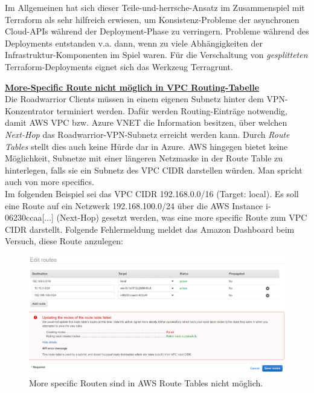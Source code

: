 Im Allgemeinen hat sich dieser \glqq Teile-und-herrsche\grqq{}-Ansatz im Zusammenspiel mit Terraform als sehr hilfreich erwiesen, um Konsistenz-Probleme der asynchronen Cloud-APIs während der Deployment-Phase zu verringern\cite[S.183-184]{Brikman2019}. Probleme während des Deployments entstanden v.a. dann, wenn \glqq zu viele\grqq{} Abhängigkeiten der Infrastruktur-Komponenten im Spiel waren. Für die Verschaltung von \textit{gesplitteten} Terraform-Deployments eignet sich das Werkzeug Terragrunt\cite[S.98]{Brikman2019}.

\newpage
\textbf{\underline{More-Specific Route nicht möglich in VPC Routing-Tabelle}}\\
Die Roadwarrior Clients müssen in einem eigenen Subnetz \glqq hinter\grqq{} dem VPN-Konzentrator terminiert werden. Dafür werden Routing-Einträge notwendig, damit AWS VPC bzw. Azure VNET die Information besitzen, über welchen \textit{Next-Hop} das Roadwarrior-VPN-Subnetz erreicht werden kann. Durch \textit{Route Tables} stellt dies auch keine Hürde dar in Azure. AWS hingegen bietet keine Möglichkeit, Subnetze mit einer längeren Netzmaske in der Route Table zu hinterlegen, falls sie ein Subnetz des VPC CIDR darstellen würden. Man spricht auch von \glqq more specifics\grqq{}.\\
Im folgenden Beispiel sei das VPC CIDR 192.168.0.0/16 (Target: local). Es soll eine Route auf ein Netzwerk 192.168.100.0/24 über die AWS Instance \glqq i-06230ccaa[...]\grqq{} (Next-Hop) gesetzt werden, was eine more specific Route zum VPC CIDR darstellt.
Folgende Fehlermeldung meldet das Amazon Dashboard beim Versuch, diese Route anzulegen:

\begin{figure}[h]
  \centering
  \includegraphics[scale=0.35]{Figures/more_specific_not_allowed_aws.PNG}
  \caption{More specific Routen sind in AWS Route Tables nicht möglich.}
  \label{grafik:more_specific_not_allowed_aws}
\end{figure}\FloatBarrier

